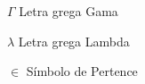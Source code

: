 \begin{simbolos}
    \item[$ \Gamma $]  Letra grega Gama
    \item[$ \lambda $] Letra grega Lambda
    \item[$ \in $] Símbolo de Pertence
\end{simbolos}